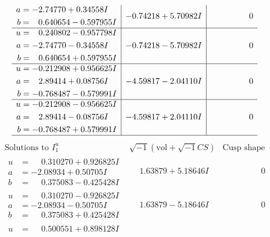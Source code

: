 \documentclass[1p]{elsarticle_modified}
\theoremstyle{definition}
\newcommand{\I}{\sqrt{-1}}
\begin{document}
$$\begin{array}{c|c|c}
\begin{aligned}
a &= -2.74770 + 0.34558 I \\
b &= \phantom{-}0.640654 - 0.597955 I\end{aligned}
 & -0.74218 + 5.70982 I & \phantom{-0.000000 } 0 \\ \hline\begin{aligned}
u &= \phantom{-}0.240802 - 0.957798 I \\
a &= -2.74770 - 0.34558 I \\
b &= \phantom{-}0.640654 + 0.597955 I\end{aligned}
 & -0.74218 - 5.70982 I & \phantom{-0.000000 } 0 \\ \hline\begin{aligned}
u &= -0.212908 + 0.956625 I \\
a &= \phantom{-}2.89414 + 0.08756 I \\
b &= -0.768487 - 0.579991 I\end{aligned}
 & -4.59817 - 2.04110 I & \phantom{-0.000000 } 0 \\ \hline\begin{aligned}
u &= -0.212908 - 0.956625 I \\
a &= \phantom{-}2.89414 - 0.08756 I \\
b &= -0.768487 + 0.579991 I\end{aligned}
 & -4.59817 + 2.04110 I & \phantom{-0.000000 } 0\\
 \hline 
 \end{array}$$\newpage$$\begin{array}{c|c|c}  
\text{Solutions to }I^u_{1}& \I (\text{vol} + \sqrt{-1}CS) & \text{Cusp shape}\\
 \hline 
\begin{aligned}
u &= \phantom{-}0.310270 + 0.926825 I \\
a &= -2.08934 + 0.50705 I \\
b &= \phantom{-}0.375083 - 0.425428 I\end{aligned}
 & \phantom{-}1.63879 + 5.18646 I & \phantom{-0.000000 } 0 \\ \hline\begin{aligned}
u &= \phantom{-}0.310270 - 0.926825 I \\
a &= -2.08934 - 0.50705 I \\
b &= \phantom{-}0.375083 + 0.425428 I\end{aligned}
 & \phantom{-}1.63879 - 5.18646 I & \phantom{-0.000000 } 0 \\ \hline\begin{aligned}
u &= \phantom{-}0.500551 + 0.898128 I \\

\end{aligned}
\end{array}$$
\end{document}
